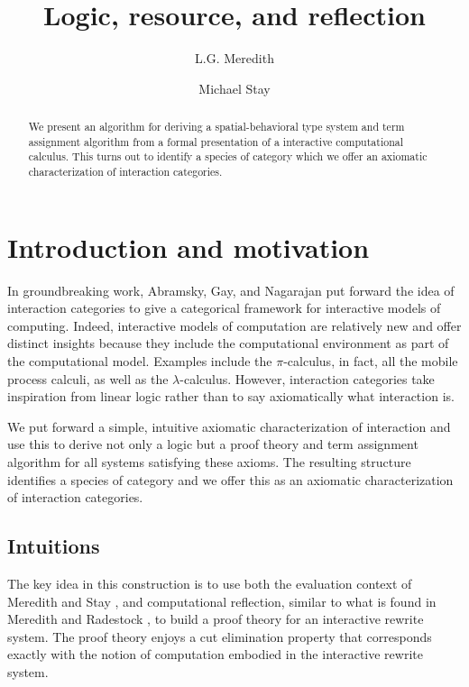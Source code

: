 \documentclass{llncs}
\title{Logic, resource, and reflection}
\author{
L.G. Meredith\inst{1}\\
\and
Michael Stay\inst{2}\\
}
\institute{
  {RChain Cooperative}\\
  \email{\fontsize{8}{8}\selectfont lgreg.meredith@rchain.coop}
  \and
  {Pyrofex Corp.}\\
  \email{\fontsize{8}{8}\selectfont stay@pyrofex.net}\\
}
\renewcommand{\:}{\colon}
\newcommand{\pic}{$\pi$-calculus}
\begin{document}
\maketitle
\begin{abstract}
\noindent
  We present an algorithm for deriving a spatial-behavioral type
  system and term assignment algorithm from a formal presentation of a
  interactive computational calculus. This turns out to identify a
  species of category which we offer an axiomatic characterization of
  interaction categories. 
\end{abstract}

\section{Introduction and motivation}

In groundbreaking work, Abramsky, Gay, and Nagarajan put forward the
idea of interaction categories to give a categorical framework for
interactive models of computing.\cite{DBLP:conf/nato/AbramskyGN96}
Indeed, interactive models of computation are relatively new and offer
distinct insights because they include the computational environment
as part of the computational model. Examples include the {\pic}, in
fact, all the mobile process calculi, as well as the
$\lambda$-calculus. \cite{milner91polyadicpi}\cite{Barendregt84} However,
interaction categories take inspiration from linear logic rather than
to say axiomatically what interaction is.

We put forward a simple, intuitive axiomatic characterization of
interaction and use this to derive not only a logic but a proof theory
and term assignment algorithm for all systems satisfying these
axioms. The resulting structure identifies a species of category and
we offer this as an axiomatic characterization of interaction
categories.

\subsection{Intuitions}

The key idea in this construction is to use both the evaluation
context of Meredith and Stay \cite{DBLP:journals/corr/StayM15}, and
computational reflection, similar to what is found in Meredith and
Radestock \cite{DBLP:journals/entcs/MeredithR05}, to build a proof
theory for an interactive rewrite system. The proof theory enjoys a
cut elimination property that corresponds exactly with the notion of
computation embodied in the interactive rewrite system.
\end{document}
